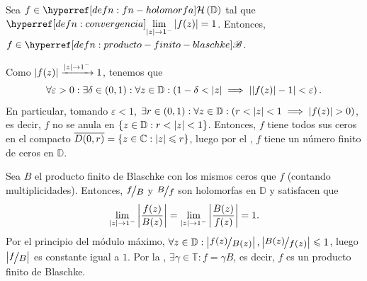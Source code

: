 \begin{teo}[Fatou]\label{teo:fatou-carac-prod-finito-blaschke-algebra-disco}
    Sea $f \in \exhyperref[defn:fn-holomorfa]{fn-holomorfa}{\mathcal{H}}\left(\mathbb{D}\right)$ tal que $\ds \exhyperref[defn:convergencia]{convergencia}{\lim_{\abs{z} \to 1^-}} \abs{f(z)} = 1$. Entonces, $f \in \exhyperref[defn:producto-finito-blaschke]{producto-finito-blaschke}{\mathscr{B}}$.
\end{teo}
\begin{dem}
    Como $\left|f(z)\right| \xrightarrow{\left|z\right| \to 1^-} 1$, tenemos que
    \[
    \forall \varepsilon > 0 : \exists \delta \in (0, 1) : \forall z \in \mathbb{D} : \left(1 - \delta < \left|z\right| \implies \left|\left|f(z)\right| - 1\right| < \varepsilon\right).
    \]
    En particular, tomando $\varepsilon < 1$, $\exists r \in (0, 1) : \forall z \in \mathbb{D} : \left(r < \left|z\right| < 1 \implies \left|f(z)\right| > 0\right)$, es decir, $f$ no se anula en $\left\{z \in \mathbb{D} : r < \left|z\right| < 1\right\}$. Entonces, $f$ tiene todos sus ceros en el compacto $\overline{D(0, r)} = \left\{z \in \mathbb{C} : \left|z\right| \leqslant r\right\}$, luego por el , $f$ tiene un número finito de ceros en $\mathbb{D}$.
    
    Sea $B$ el producto finito de Blaschke con los mismos ceros que $f$ (contando multiplicidades). Entonces, $\sfrac{f}{B}$ y $\sfrac{B}{f}$ son holomorfas en $\mathbb{D}$ y satisfacen que
    \[
    \lim_{\left|z\right| \to 1^-} \left|\frac{f(z)}{B(z)}\right| = \lim_{\left|z\right| \to 1^-} \left|\frac{B(z)}{f(z)}\right| = 1.
    \]
    Por el principio del módulo máximo, $\forall z \in \mathbb{D} : \abs{\sfrac{f(z)}{B(z)}}, \abs{\sfrac{B(z)}{f(z)}} \leq 1$, luego $\abs{\sfrac{f}{B}}$ es constante igual a $1$. Por la , $\exists \gamma \in \mathbb{T} : f = \gamma B$, es decir, $f$ es un producto finito de Blaschke.\hfill\qedsymbol
\end{dem}

